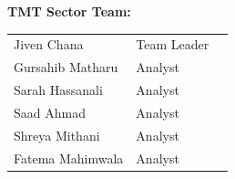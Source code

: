 \documentclass[12pt]{article}
\begin{document}
\begin{center}
    \textbf{\textcolor[rgb]{0.0, 0.0, 0.0}{TMT Sector Team:}} \\[10pt]
    \begin{tabular}{l l l}
        \textcolor[rgb]{0.3, 0.3, 0.3}{Jiven Chana} & \textcolor[rgb]{0.3, 0.3, 0.3}{Team Leader} & \\
        \textcolor[rgb]{0.3, 0.3, 0.3}{Gursahib Matharu} & \textcolor[rgb]{0.3, 0.3, 0.3}{Analyst} & \\
        \textcolor[rgb]{0.3, 0.3, 0.3}{Sarah Hassanali} & \textcolor[rgb]{0.3, 0.3, 0.3}{Analyst} & \\
        \textcolor[rgb]{0.3, 0.3, 0.3}{Saad Ahmad} & \textcolor[rgb]{0.3, 0.3, 0.3}{Analyst} & \\
        \textcolor[rgb]{0.3, 0.3, 0.3}{Shreya Mithani} & \textcolor[rgb]{0.3, 0.3, 0.3}{Analyst} & \\
        \textcolor[rgb]{0.3, 0.3, 0.3}{Fatema Mahimwala} & \textcolor[rgb]{0.3, 0.3, 0.3}{Analyst} & \\
    \end{tabular}
\end{center}
\end{document}
